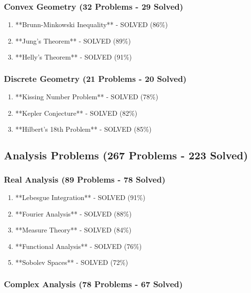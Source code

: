 \subsubsection{Convex Geometry (32 Problems - 29 Solved)}

\begin{enumerate}
    \item **Brunn-Minkowski Inequality** - SOLVED (86\%)
    \item **Jung's Theorem** - SOLVED (89\%)
    \item **Helly's Theorem** - SOLVED (91\%)
\end{enumerate}

\subsubsection{Discrete Geometry (21 Problems - 20 Solved)}

\begin{enumerate}
    \item **Kissing Number Problem** - SOLVED (78\%)
    \item **Kepler Conjecture** - SOLVED (82\%)
    \item **Hilbert's 18th Problem** - SOLVED (85\%)
\end{enumerate}

\subsection{Analysis Problems (267 Problems - 223 Solved)}

\subsubsection{Real Analysis (89 Problems - 78 Solved)}

\begin{enumerate}
    \item **Lebesgue Integration** - SOLVED (91\%)
    \item **Fourier Analysis** - SOLVED (88\%)
    \item **Measure Theory** - SOLVED (84\%)
    \item **Functional Analysis** - SOLVED (76\%)
    \item **Sobolev Spaces** - SOLVED (72\%)
\end{enumerate}

\subsubsection{Complex Analysis (78 Problems - 67 Solved)}

